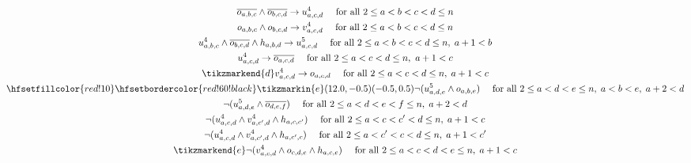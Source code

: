 \begin{figure}
\begin{spreadlines}{16pt}
\begin{gather}
  \ov{\orvar_{a,b,c}} \land \ov{\orvar_{b,c,d}} \rightarrow \uvar_{a, c, d} \quad \text{ for all } 2 \leq a < b < c < d \leq n\label{eq:capDef}\\
  \orvar_{a, b, c} \land \orvar_{b, c, d} \rightarrow \vvar_{a, c, d} \quad \text{ for all } 2 \leq a < b < c < d \leq n \label{eq:cupDef}\\
  \uvar_{a,b,c} \land \ov{\orvar_{b,c,d}} \land \hvar_{a,b,d} \rightarrow \ufvar_{a, c, d} \quad \text{ for all } 2 \leq a < b < c < d \leq n,\; a+1<b\label{eq:capFDef}\\
  \uvar_{a, c, d} \rightarrow \ov{\orvar_{a,c,d}} \quad \text{ for all } 2 \leq a < c < d \leq n,\ a+1<c\label{eq:capDef2}\\
  \tikzmarkend{d}\vvar_{a, c, d} \rightarrow \orvar_{a,c,d} \quad \text{ for all } 2 \leq a < c < d \leq n,\; a+1<c\label{eq:cupDef2}\\
%
\hfsetfillcolor{red!10}
\hfsetbordercolor{red!60!black}
\tikzmarkin{e}(12.0,-0.5)(-0.5,0.5)
  \neg(\ufvar_{a,d,e} \land \orvar_{a, b, e}) \quad \text { for all } 2 \leq a < d < e \leq n, \; a < b < e, \; a+2 < d\label{eq:no6Hole1Below}\\
  \neg(\ufvar_{a,d,e} \land \ov{\orvar_{d, e, f}}) \quad \text { for all } 2 \leq a < d < e < f\leq n, \; a+2 < d\label{eq:no6Hole4Above}\\
  \neg(\uvar_{a,c,d} \land \vvar_{a, c', d} \land \hvar_{a,c,c'}) \quad \text{ for all } 2 \leq a < c < c' < d \leq n, \; a+1 < c\label{eq:no6Hole2Below1}\\
  \neg(\uvar_{a,c,d} \land \vvar_{a, c', d} \land \hvar_{a,c',c}) \quad \text{ for all } 2 \leq a < c' < c < d \leq n, \; a+1 < c'\label{eq:no6Hole2Below2}\\
  \tikzmarkend{e}\neg(\vvar_{a,c,d} \land \orvar_{c, d, e} \land \hvar_{a,c,e}) \quad \text{ for all } 2 \leq a < c < d < e \leq n, \; a+1 < c\label{eq:no6Hole3Below}
  \end{gather}
\end{spreadlines}
\end{figure}
